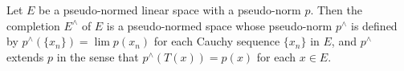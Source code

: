 Let $E$ be a pseudo-normed linear space with a pseudo-norm $p$. Then the completion $E^\wedge$ of $E$ is a pseudo-normed space whose pseudo-norm $p^\wedge$ is defined by $p^\wedge(\{x_n\}) = \lim p(x_n)$ for each Cauchy sequence $\{x_n\}$ in $E$, and $p^\wedge$ extends $p$ in the sense that $p^\wedge(T(x)) = p(x)$ for each $x \in E$.
